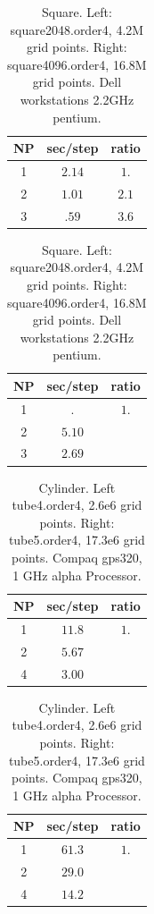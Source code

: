 \begin{table}[hbt]
\begin{center}\footnotesize
\begin{tabular}{|c|c|c|} \hline 
     NP       & sec/step   & ratio      \\   \hline\hline 
     1        &  $2.14$    & $ 1. $     \\ 
     2        &  $1.01$    & $ 2.1$     \\ 
     3        &  $.59 $    & $ 3.6$     \\ \hline 
\end{tabular}	
\qquad
\begin{tabular}{|c|c|c|} \hline 
     NP       & sec/step   & ratio \\   \hline\hline 
     1        &  $.   $    & $ 1. $   \\ 
     2        &  $5.10$    & $    $   \\ 
     3        &  $2.69$    & $    $   \\ \hline 
\end{tabular}		
\qquad

\end{center}		
\caption{Square. Left: square2048.order4, 4.2M grid points.
                 Right: square4096.order4, 16.8M grid points. Dell workstations 2.2GHz pentium.}
 \label{tab:box} 
\end{table}

\begin{table}[hbt]
\begin{center}\footnotesize
\begin{tabular}{|c|c|c|} \hline 
     NP       & sec/step   & ratio \\   \hline\hline 
     1        &  $11.8$    & $ 1. $   \\ 
     2        &  $5.67$    & $    $   \\ 
     4        &  $3.00$    & $    $   \\ \hline 
\end{tabular}		
\qquad
\begin{tabular}{|c|c|c|} \hline 
     NP       & sec/step   & ratio \\   \hline\hline 
     1        &  $61.3$    & $ 1. $   \\ 
     2        &  $29.0$    & $    $   \\ 
     4        &  $14.2$    & $    $   \\ \hline 
\end{tabular}
\end{center}		
\caption{Cylinder. Left tube4.order4, 2.6e6 grid points. Right: tube5.order4, 17.3e6 grid points. 
Compaq gps320, 1 GHz alpha Processor.}
 \label{tab:box} 
\end{table}

